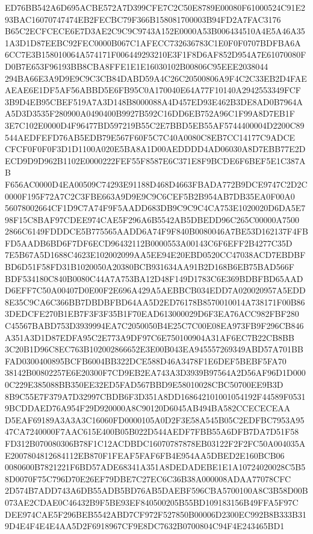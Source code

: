 \documentclass[UTF8,fontset=fandol,zihao=-4,a4paper]{ctexart}
\begin{document}
{{ED76BB542A6D695ACBE572A7D399CFE7C2C50E8789E00080F61000524C91E293BAC16070747474EB2FECBC79F366B158081700003B94FD2A7FAC3176
B65C2ECFCECE6E7D3AE2C9C9C9743A152E0000A53B006434510A4E5A46A351A3D1D87EEBC92FEC0000B067C1AFECC732636783C1E0F0F0707BDFBA6A
6CC7E3B158010064A574171F006449293210E3F1F8D6AF852D954A7E61070080FD0B7E653F96193BB8CBA8FFE1E1E16030102B00806C95EEE2038044
294BA66E3A9D9E9C9C3CB84DABD59A4C26C20500806A9F4C2C33EB2D4FAEAEAE6E1DF5AF56ABBD5E6FB95C0A170040E64A77F10140A2942553349FCF
3B9D4EB95CBEF519A7A3D148B8000088A4D457ED93E462B3DE8AD0B7964AA5D3D3535F280900A0490400B9927B592C16DD6EB752A96C1F99A8D7EB1F
3E7C102E0000D4F96477BD597219B55C2E7BBD5EB55AF5744400004D2200C89544AEDFEFD76AB5EDB79E567F60F5C7C40A0080C8EB7CC14177C9ADCE
CFCF0F0F0F3D1D1100A020E5BA8A1D00AEDDDD4AD06030A8D7EBB77E2DECD9D9D962B1102E0000222FEF55F8587E6C371E8F9BCDE6F6BEF5E1C387AB
F656AC0000D4EA00509C74293E91188D468D4663FBADA772B9DCE9747C2D2C0000F195F72A7C2C3FBE663A9D9E9C9C6CEF5B2B954AB7DB35EA0F00A0
56078002664CF1D9C7A74F9F5AADD683DB9C9C9C4CA753E1020020D6DA5E798F15C8BAF97CDEE974CAE5F296A6B5542AB5DBEDD96C265C00000A7500
2866C6149FDDDCE5B775565AADD6A74F9F840B0080046A7BE53D162137F4FBFD5AADB6BD6F7DF6ECD96432112B0000553A00143C6F6EFF2B4277C35D
7E5B67A5D1688C4623E102002099AA5EE94E20EBD0520CC47038ACD7EBDBFBD6D51F58FD31B1020050A20380BCB931634AA91B2D168B6EB75BAD566F
BDF534180C840B0080C44A7A753BA12D48F149D1783C6E369BDBFBD65AADD6EFF7C50A00407D0E00F2E696A429A5AEBBCB034EDD7A020020957A5EDD
8E35C9CA6C366BB7DBDBFBD64AA5D2ED76178B8570010014A738171F00B863DEDCFE270B1EB7F3F3F35B1F70EAD613000029D6F3EA76ACC982FBF280
C45567BABD753D3939994EA7C2050050B4E25C7C00E08EA973FB9F296CB846A351A3D1D87EDFA95C2E773A9DF97C6E750100904A31AF6EC7B22CB8BB
3C20B1D96C8EC763B102002866652E3E00B043EA945557269349ABD57A701BBFAD0300400895BCFB6004BB322DCE588D46A3478F1E6DEF5BEBF5FA70
38142B00802257E6E20300F7CD9EB2EA743A3D3939B97564A2D56AF96D1D0000C229E385088BB350EE32ED5FAD567BBD9E58010028CBC50700EE9B3D
8B9C55E7F379A7D32997CBDB6F3D351A8DD168642101001054192F44589F05319BCDDAED76A954F29D920000A8C90120D6045AB494BA582CCECECEAA
D5EAF69189A3A3A3C16060FD0000105A0D2F3E58A545B05C2EDFBC7953A9547CA7240000F7AAC615E400B05B022D544AEDF7FBB55A6DFB7DA7D51F58
FD312B070080306B78F1C12ACDBDC16070787878EB03122F2F2FC50A004035AE2007804812684112EB870F1FEAF5FAF6FB4E954AA5DBED2E160BCB06
0080600B7821221F6BD57ADE68341A351A8DEDADEBE1E1A10724020028C5B58D0070F75C796D70E26EF79DBE7C27EC6C36B38A000008ADAA77078CFC
2D574B7ADD743A6DB55ADB5BD76AB5DAEBF596CBA5700100A8C3B58D00B073AE2CDAE0C46432B9F5BE93EF840500205B55BD109183156B49FFA5F97C
DEE974CAE5F296BEB5542ABD7CF972F527850B00006D2300EC992B8B333B319D4E4F4E4E4AA5D2F6918967CF9E8DC7632B0700804C94F4E243465BD1
}}
\end{document}

